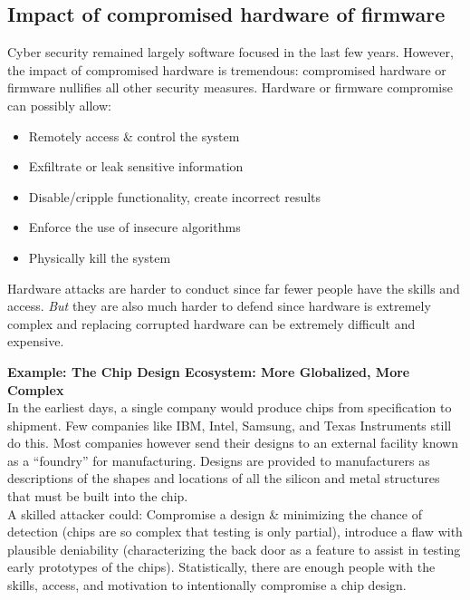 \documentclass[11pt,oneside,a4paper]{article}
\begin{document}
\subsection{Impact of compromised hardware of firmware}

Cyber security remained largely software focused in the last few years. However, the impact of compromised hardware is tremendous: compromised hardware or firmware nullifies all other security measures. Hardware or firmware compromise can possibly allow:

\vspace{-\topsep}
\begin{itemize}
	\setlength{\itemsep}{0pt}
	\setlength{\parskip}{0pt}
	\item Remotely access \& control the system
	\item Exfiltrate or leak sensitive information
	\item Disable/cripple functionality, create incorrect results
	\item Enforce the use of insecure algorithms
	\item Physically kill the system
\end{itemize}
\vspace{-\topsep}

Hardware attacks are harder to conduct since far fewer people have the skills and access. \textit{But} they are also much harder to defend since hardware is extremely complex and replacing corrupted hardware can be extremely difficult and expensive.

\textbf{Example: The Chip Design Ecosystem: More Globalized, More Complex}\\
In the earliest days, a single company would produce chips from specification to shipment. Few companies like IBM, Intel, Samsung, and Texas Instruments still do this. Most companies however send their designs to an external facility known as a “foundry” for manufacturing. Designs are provided to manufacturers as descriptions of the shapes and locations of all the silicon and metal structures that must be built into the chip.\\
A skilled attacker could: Compromise a design \& minimizing the chance of detection (chips are so complex that testing is only partial), introduce a flaw with plausible deniability (characterizing the back door as a feature to assist in testing early prototypes of the chips). Statistically, there are enough people with the skills, access, and motivation to intentionally compromise a chip design.\\
\end{document}
